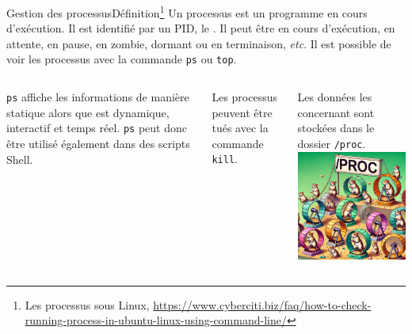 \documentclass{beamer}
\begin{document}
    \begin{frame}{Gestion des processus}{Définition\footnote{\label{process}Les processus sous Linux, \url{https://www.cyberciti.biz/faq/how-to-check-running-process-in-ubuntu-linux-using-command-line/}}}
        Un processus est un programme en cours d'exécution.
        Il est identifié par un PID, le .
        \bigbreak
        Il peut être en cours d'exécution, en attente, en pause, en zombie, dormant ou en terminaison, \textit{etc}.
        Il est possible de voir les processus avec la commande \lstinline{ps} ou \lstinline{top}.
        \bigbreak
        \begin{columns}
            \lstinline{ps} affiche les informations de manière statique alors que est dynamique, interactif et temps réel.
            \lstinline{ps} peut donc être utilisé également dans des scripts Shell.

            Les processus peuvent être tués avec la commande \lstinline{kill}.

            Les données les concernant sont stockées dans le dossier \lstinline{/proc}.
            \centering
            \includegraphics[width=4cm]{image/proc-hamster}
        \end{columns}
    \end{frame}
\end{document}
